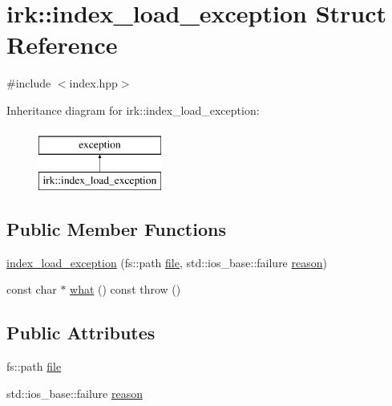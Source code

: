 \hypertarget{structirk_1_1index__load__exception}{}\section{irk\+:\+:index\+\_\+load\+\_\+exception Struct Reference}
\label{structirk_1_1index__load__exception}


{\ttfamily \#include $<$index.\+hpp$>$}

Inheritance diagram for irk\+:\+:index\+\_\+load\+\_\+exception\+:\begin{figure}[H]
\begin{center}
\leavevmode
\includegraphics[height=2.000000cm]{structirk_1_1index__load__exception}
\end{center}
\end{figure}
\subsection*{Public Member Functions}
\begin{DoxyCompactItemize}
\item 
\mbox{\hyperlink{structirk_1_1index__load__exception_acd2dcb43dea0e63939f0e264ea4fb9bb}{index\+\_\+load\+\_\+exception}} (fs\+::path \mbox{\hyperlink{structirk_1_1index__load__exception_a38c51abcb6c272187ba08e0c9ad7f674}{file}}, std\+::ios\+\_\+base\+::failure \mbox{\hyperlink{structirk_1_1index__load__exception_aa175d8f2c63df9d2451e57830e2e2467}{reason}})
\item 
const char $\ast$ \mbox{\hyperlink{structirk_1_1index__load__exception_a6c04e64e054848c9de292719d1306c5c}{what}} () const  throw ()
\end{DoxyCompactItemize}
\subsection*{Public Attributes}
\begin{DoxyCompactItemize}
\item 
fs\+::path \mbox{\hyperlink{structirk_1_1index__load__exception_a38c51abcb6c272187ba08e0c9ad7f674}{file}}
\item 
std\+::ios\+\_\+base\+::failure \mbox{\hyperlink{structirk_1_1index__load__exception_aa175d8f2c63df9d2451e57830e2e2467}{reason}}
\end{DoxyCompactItemize}


